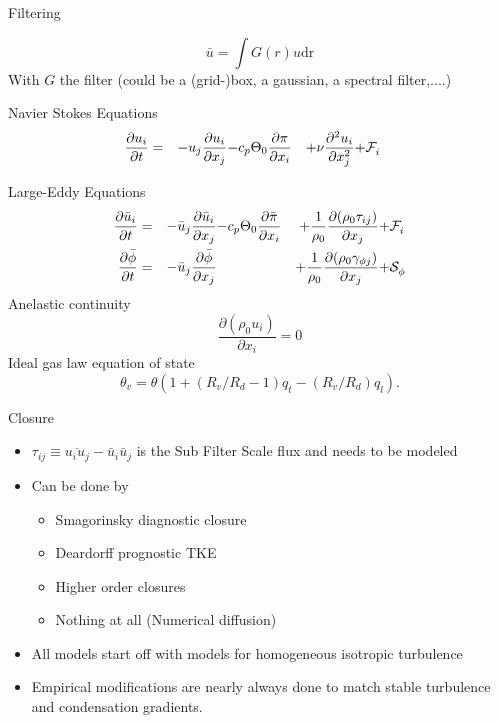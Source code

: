 \begin{frame}{Filtering}

\[
 \bar{u} = \int G(r) u \mathrm{dr}
\]
 With $G$ the filter (could be a (grid-)box, a gaussian, a spectral filter,....)
\end{frame}

\begin{frame}{Navier Stokes Equations}
 \begin{align*}
\frac{\partial {u}_i}{\partial t} & = 
&{- {u}_j \frac{\partial {u}_i}{\partial x_j} }
&{- c_p \Theta_0 \frac{\partial{\pi}}{\partial x_i}}
&{+ \nu \frac{\partial^2 u_i} {\partial x^2_j}}
&{ + \mathcal{F}_{i}^{\mathrm{}} }
\end{align*}

\end{frame}

\begin{frame}{Large-Eddy Equations}
 \begin{align*}
\frac{\partial \bar{u}_i}{\partial t} & = 
&{- \bar{u}_j \frac{\partial \bar{u}_i}{\partial x_j} }
&{- c_p \Theta_0 \frac{\partial\bar{\pi}}{\partial x_i}}
&{+ \frac{1}{\rho_0} \frac{\partial (\rho_0 \tau_{ij})} {\partial x_j}}
&{ + \mathcal{F}_{i}^{\mathrm{}} }
\\
\frac{\partial \bar{\phi}}{\partial t} & = 
&{ - \bar{u}_j \frac{\partial  \bar{\phi}}{\partial x_j}} 
&&{+ \frac{1}{\rho_0} \frac{\partial (\rho_0  \gamma_{\phi j})} {\partial x_j}}
&{+\mathcal{S}_{\phi}^{\mathrm{}}}
\end{align*}
{
Anelastic continuity $$
 \frac{\partial (\rho_0 u_i) }{\partial x_i} = 0 \label{eq:continuity}
$$
}
{
Ideal gas law equation of state $$\theta_v = \theta\left(1 + (R_v/R_d-1)q_t - (R_v/R_d)q_l\right).$$
}

\end{frame}

\begin{frame}{Closure}
 \begin{itemize}
  \item $\tau_{ij} \equiv \overline{u_i u_j} - \bar{u}_i \bar{u}_j $ is the Sub Filter Scale flux and needs to be modeled
  \item Can be done by
  \begin{itemize}
   \item Smagorinsky diagnostic closure
   \item Deardorff prognostic TKE
   \item Higher order closures
   \item Nothing at all (Numerical diffusion)
  \end{itemize}
  \item All models start off with models for homogeneous isotropic turbulence 
  \item Empirical modifications are nearly always done to match stable turbulence and condensation gradients.
 \end{itemize}
\end{frame}
